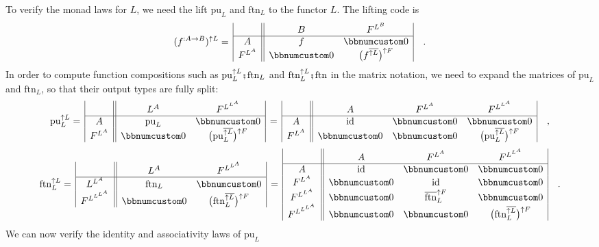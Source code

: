 To verify the monad laws for $L$, we need the lift $\text{pu}_{L}$
and $\text{ftn}_{L}$ to the functor $L$. The lifting code is
\[
(f^{:A\rightarrow B})^{\uparrow L}=\,\begin{array}{|c||cc|}
 & B & F^{L^{B}}\\
\hline A & f & \bbnum 0\\
F^{L^{A}} & \bbnum 0 & \big(f^{\overline{\uparrow L}}\big)^{\uparrow F}
\end{array}\quad.
\]
In order to compute function compositions such as $\text{pu}_{L}^{\uparrow L}\bef\text{ftn}_{L}$
and $\text{ftn}_{L}^{\uparrow L}\bef\text{ftn}$ in the matrix notation,
we need to expand the matrices of $\text{pu}_{L}$ and $\text{ftn}_{L}$,
so that their output types are fully split:
\[
\text{pu}_{L}^{\uparrow L}=\,\begin{array}{|c||cc|}
 & L^{A} & F^{L^{L^{A}}}\\
\hline A & \text{pu}_{L} & \bbnum 0\\
F^{L^{A}} & \bbnum 0 & \big(\text{pu}_{L}^{\overline{\uparrow L}}\big)^{\uparrow F}
\end{array}\,=\,\begin{array}{|c||ccc|}
 & A & F^{L^{A}} & F^{L^{L^{A}}}\\
\hline A & \text{id} & \bbnum 0 & \bbnum 0\\
F^{L^{A}} & \bbnum 0 & \bbnum 0 & \big(\text{pu}_{L}^{\overline{\uparrow L}}\big)^{\uparrow F}
\end{array}\quad,
\]
\[
\text{ftn}_{L}^{\uparrow L}=\,\begin{array}{|c||cc|}
 & L^{A} & F^{L^{L^{A}}}\\
\hline L^{L^{A}} & \text{ftn}_{L} & \bbnum 0\\
F^{L^{L^{L^{A}}}} & \bbnum 0 & \big(\text{ftn}_{L}^{\overline{\uparrow L}}\big)^{\uparrow F}
\end{array}\,=\,\begin{array}{|c||ccc|}
 & A & F^{L^{A}} & F^{L^{L^{A}}}\\
\hline A & \text{id} & \bbnum 0 & \bbnum 0\\
F^{L^{A}} & \bbnum 0 & \text{id} & \bbnum 0\\
F^{L^{L^{A}}} & \bbnum 0 & \overline{\text{ftn}}_{L}^{\uparrow F} & \bbnum 0\\
F^{L^{L^{L^{A}}}} & \bbnum 0 & \bbnum 0 & \big(\text{ftn}_{L}^{\overline{\uparrow L}}\big)^{\uparrow F}
\end{array}\quad.
\]
We can now verify the identity and associativity laws of $\text{pu}_{L}$
